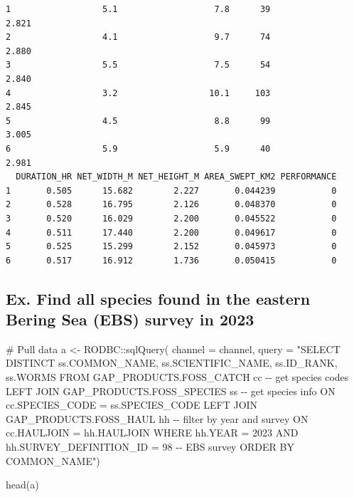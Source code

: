\documentclass[
  letterpaper,
  oneside,
  open=any]{scrbook}
\newenvironment{Shaded}{\begin{snugshade}}{\end{snugshade}}
\newcommand{\AttributeTok}[1]{\textcolor[rgb]{0.40,0.45,0.13}{#1}}
\newcommand{\CommentTok}[1]{\textcolor[rgb]{0.37,0.37,0.37}{#1}}
\newcommand{\FunctionTok}[1]{\textcolor[rgb]{0.28,0.35,0.67}{#1}}
\newcommand{\NormalTok}[1]{\textcolor[rgb]{0.00,0.23,0.31}{#1}}
\newcommand{\OtherTok}[1]{\textcolor[rgb]{0.00,0.23,0.31}{#1}}
\newcommand{\SpecialCharTok}[1]{\textcolor[rgb]{0.37,0.37,0.37}{#1}}
\newcommand{\StringTok}[1]{\textcolor[rgb]{0.13,0.47,0.30}{#1}}
\begin{document}
\begin{verbatim}
1                  5.1                   7.8      39              2.821
2                  4.1                   9.7      74              2.880
3                  5.5                   7.5      54              2.840
4                  3.2                  10.1     103              2.845
5                  4.5                   8.8      99              3.005
6                  5.9                   5.9      40              2.981
  DURATION_HR NET_WIDTH_M NET_HEIGHT_M AREA_SWEPT_KM2 PERFORMANCE
1       0.505      15.682        2.227       0.044239           0
2       0.528      16.795        2.126       0.048370           0
3       0.520      16.029        2.200       0.045522           0
4       0.511      17.440        2.200       0.049617           0
5       0.525      15.299        2.152       0.045973           0
6       0.517      16.912        1.736       0.050415           0
\end{verbatim}

\hypertarget{ex.-find-all-species-found-in-the-eastern-bering-sea-ebs-survey-in-2023}{%
\subsection{Ex. Find all species found in the eastern Bering Sea (EBS)
survey in
2023}\label{ex.-find-all-species-found-in-the-eastern-bering-sea-ebs-survey-in-2023}}

\begin{Shaded}
\begin{Highlighting}[]
\CommentTok{\# Pull data}
\NormalTok{a }\OtherTok{\textless{}{-}}\NormalTok{ RODBC}\SpecialCharTok{::}\FunctionTok{sqlQuery}\NormalTok{(}
\AttributeTok{channel =}\NormalTok{ channel, }
\AttributeTok{query =} 
\StringTok{"SELECT DISTINCT }
\StringTok{ss.COMMON\_NAME,}
\StringTok{ss.SCIENTIFIC\_NAME, }
\StringTok{ss.ID\_RANK, }
\StringTok{ss.WORMS}
\StringTok{FROM GAP\_PRODUCTS.FOSS\_CATCH cc {-}{-} get species codes}
\StringTok{LEFT JOIN GAP\_PRODUCTS.FOSS\_SPECIES ss {-}{-} get species info}
\StringTok{ON cc.SPECIES\_CODE = ss.SPECIES\_CODE}
\StringTok{LEFT JOIN GAP\_PRODUCTS.FOSS\_HAUL hh {-}{-} filter by year and survey}
\StringTok{ON cc.HAULJOIN = hh.HAULJOIN}
\StringTok{WHERE hh.YEAR = 2023}
\StringTok{AND hh.SURVEY\_DEFINITION\_ID = 98 {-}{-} EBS survey}
\StringTok{ORDER BY COMMON\_NAME"}\NormalTok{)}

\FunctionTok{head}\NormalTok{(a)}
\end{Highlighting}
\end{Shaded}
\end{document}
